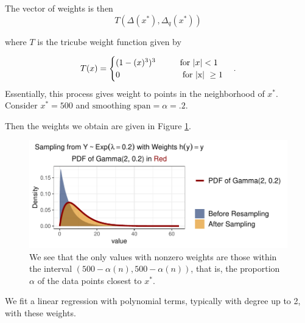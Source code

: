 \documentclass[12pt,twoside]{smiththesis}
\begin{document}
The vector of weights is then
\[T(\Delta(x^*), \Delta_q(x^*))\]

where \(T\) is the tricube weight function given by

\[
T(x) = \begin{cases} (1-(x)^3)^3 \hspace{9 mm}  \text{ for } |x| < 1\\
0  \hspace{25 mm} \text{ for |x| } \geq 1 \end{cases}.
\]
Essentially, this process gives weight to points in the neighborhood of \(x^*\). Consider \(x^* = 500\) and \(\text{smoothing span} = \alpha = .2\).

Then the weights we obtain are given in Figure \ref{fig:weights}.
\begin{figure}
\centering
\includegraphics{thesis_files/figure-latex/unnamed-chunk-16-1.pdf}
\caption{\label{fig:unnamed-chunk-16}\label{fig:weights} We see that the only values with nonzero weights are those within the interval \((500 - \alpha (n), 500 - \alpha (n))\), that is, the proportion \(\alpha\) of the data points closest to \(x^*\).}
\end{figure}
We fit a linear regression with polynomial terms, typically with degree up to 2, with these weights.
\end{document}
